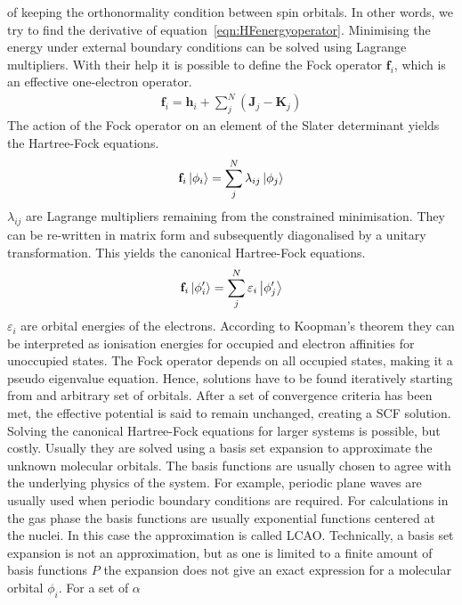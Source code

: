 of keeping the orthonormality condition between spin orbitals. In other words,
we try to find the derivative of equation~\eqref{eqn:HFenergyoperator}.
Minimising the energy under external boundary conditions can be solved using
Lagrange multipliers. With their help it is possible to define the Fock
operator $\mathbf{f}_i$, which is an effective one-electron operator.
%
\begin{align}
    \mathbf{f}_i=\mathbf{h}_i + \sum_j^N\left( \mathbf{J}_j - \mathbf{K}_j \right)
\end{align}
%
The action of the Fock operator on an element of the Slater determinant yields
the Hartree-Fock equations.
%
\begin{align}
    \mathbf{f}_i\ket{\phi_i}=\sum_j^N\lambda_{ij}\ket{\phi_j}\label{eqn:HFequations}
\end{align}
%
$\lambda_{ij}$ are Lagrange multipliers remaining from the constrained
minimisation. They can be re-written in matrix form and subsequently
diagonalised by a unitary transformation. This yields the canonical
Hartree-Fock equations.
%
\begin{align}
    \mathbf{f}_i\ket{\phi'_i}=\sum_j^N\varepsilon_i\ket{\phi'_j}\label{eqn:HFequationscanonical}
\end{align}
%
$\varepsilon_i$ are orbital energies of the electrons. According to Koopman's
theorem they can be interpreted as ionisation energies for occupied and
electron affinities for unoccupied states. The Fock operator depends on all
occupied states, making it a pseudo eigenvalue equation. Hence, solutions have
to be found iteratively starting from and arbitrary set of orbitals. After a
set of convergence criteria has been met, the effective potential is said to
remain unchanged, creating a \ac{SCF} solution.  \\\newline Solving the
canonical Hartree-Fock equations for larger systems is possible, but costly.
Usually they are solved using a basis set expansion to approximate the unknown
molecular orbitals. The basis functions are usually chosen to agree with the
underlying physics of the system. For example, periodic plane waves are
usually used when periodic boundary conditions are required. For calculations
in the gas phase the basis functions are usually exponential functions
centered at the nuclei. In this case the approximation is called \ac{LCAO}.
Technically, a basis set expansion is not an approximation, but as one is
limited to a finite amount of basis functions $P$ the expansion does not give
an exact expression for a molecular orbital $\phi_i$. For a set of $\alpha$

